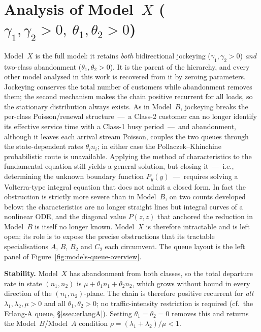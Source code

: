 \section{Analysis of Model~\texorpdfstring{$X$}{X} (\texorpdfstring{$\gamma_1,\gamma_2>0,\ \theta_1,\theta_2>0$}{gamma1,gamma2>0, theta1,theta2>0})}\label{sec:model_x_anal}

Model~$X$ is the full model: it retains \emph{both} bidirectional jockeying
($\gamma_1,\gamma_2>0$) \emph{and} two-class abandonment ($\theta_1,\theta_2>0$). It is
the parent of the hierarchy, and every other model analysed in this work is recovered
from it by zeroing parameters. Jockeying conserves the total number of customers while
abandonment removes them; the second mechanism makes the chain positive recurrent for
all loads, so the stationary distribution always exists. As in Model~$B$, jockeying
breaks the per-class Poisson/renewal structure~---~a Class-2 customer can no longer
identify its effective service time with a Class-1 busy period~---~and abandonment,
although it leaves each arrival stream Poisson, couples the two queues through the
state-dependent rates $\theta_i n_i$; in either case the Pollaczek--Khinchine
probabilistic route is unavailable. Applying the method of characteristics to the
fundamental equation still yields a general solution, but closing it~---~i.e.,
determining the unknown boundary function $P_y(y)$~---~requires solving a Volterra-type
integral equation that does not admit a closed form. In fact the obstruction is
strictly more severe than in Model~$B$, on two counts developed below: the
characteristics are no longer straight lines but integral curves of a nonlinear ODE,
and the diagonal value $P(z,z)$ that anchored the reduction in Model~$B$ is itself no
longer known. Model~$X$ is therefore intractable and is left open; its role is to
expose the precise obstructions that its tractable specialisations
$A$, $B$, $B_2$ and $C_2$ each circumvent. The queue layout is the left panel of
Figure~\ref{fig:models-queue-overview}.

\textbf{Stability.} Model~$X$ has abandonment from both classes, so the total departure
rate in state $(n_1,n_2)$ is $\mu+\theta_1 n_1+\theta_2 n_2$, which grows without bound
in every direction of the $(n_1,n_2)$-plane. The chain is therefore positive recurrent
for \emph{all} $\lambda_1,\lambda_2,\mu>0$ and all $\theta_1,\theta_2>0$; no
traffic-intensity restriction is required (cf.\ the Erlang-A queue,
\S\ref{ssec:erlangA}). Setting $\theta_1=\theta_2=0$ removes this and returns the
Model~$B$/Model~$A$ condition $\rho=(\lambda_1+\lambda_2)/\mu<1$.

